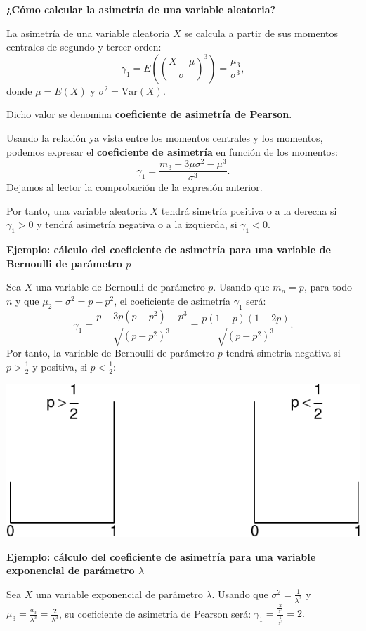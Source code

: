\documentclass[
  letterpaper,
  DIV=11,
  numbers=noendperiod]{scrreprt}
\begin{document}
\textbf{¿Cómo calcular la asimetría de una variable aleatoria?}

La asimetría de una variable aleatoria \(X\) se calcula a partir de sus
momentos centrales de segundo y tercer orden: \[
\gamma_1 = E\left({\left(\frac{X-\mu}{\sigma}\right)}^3\right)=\frac{\mu_3}{\sigma^3},
\] donde \(\mu = E(X)\) y \(\sigma^2 =\mathrm{Var}(X)\).

Dicho valor se denomina \textbf{coeficiente de asimetría de Pearson}.

Usando la relación ya vista entre los momentos centrales y los momentos,
podemos expresar el \textbf{coeficiente de asimetría} en función de los
momentos: \[
\gamma_1 = \frac{m_3 -3\mu\sigma^2-\mu^3}{\sigma^3}.
\] Dejamos al lector la comprobación de la expresión anterior.

Por tanto, una variable aleatoria \(X\) tendrá simetría positiva o a la
derecha si \(\gamma_1 >0\) y tendrá asimetría negativa o a la izquierda,
si \(\gamma_1 <0\).

\textbf{Ejemplo: cálculo del coeficiente de asimetría para una variable
de Bernoulli de parámetro \(p\)}

Sea \(X\) una variable de Bernoulli de parámetro \(p\). Usando que
\(m_n =p\), para todo \(n\) y que \(\mu_2 = \sigma^2 = p-p^2\), el
coeficiente de asimetría \(\gamma_1\) será: \[
\gamma_1 = \frac{p-3p(p-p^2)-p^3}{\sqrt{(p-p^2)^3}} = \frac{p (1-p) (1-2p)}{{\sqrt{(p-p^2)^3}}}.
\] Por tanto, la variable de Bernoulli de parámetro \(p\) tendrá
simetria negativa si \(p>\frac{1}{2}\) y positiva, si \(p<\frac{1}{2}\):

\includegraphics{4_files/figure-pdf/unnamed-chunk-2-1.pdf}

\textbf{Ejemplo: cálculo del coeficiente de asimetría para una variable
exponencial de parámetro \(\lambda\)}

Sea \(X\) una variable exponencial de parámetro \(\lambda\). Usando que
\(\sigma^2=\frac{1}{\lambda^2}\) y
\(\mu_3 =\frac{a_3}{\lambda^3}=\frac{2}{\lambda^3}\), su coeficiente de
asimetría de Pearson será:
\(\gamma_1 = \frac{\frac{2}{\lambda^3}}{\frac{1}{\lambda^3}}=2.\)
\end{document}
